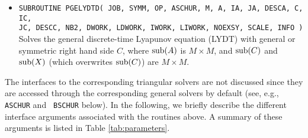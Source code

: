 \documentclass[11pt]{article}
\begin{document}
\begin{itemize}
\item \texttt{SUBROUTINE PGELYDTD( JOB, SYMM, OP, ASCHUR, M, A,
IA, JA, DESCA, C, IC, \\ JC, DESCC, NB2, DWORK, LDWORK, IWORK,
LIWORK, NOEXSY, SCALE, INFO ) } \\
Solves the general discrete-time Lyapunov equation (LYDT) with
general or symmetric right hand side $C$, where ${\rm sub}(A)$ is
$M \times M$, and ${\rm sub}(C)$ and ${\rm sub}(X)$ (which
overwrites ${\rm sub}(C)$) are $M \times M$. \\
\end{itemize}

The interfaces to the corresponding triangular solvers are not
discussed since they are accessed through the corresponding
general solvers by default (see, e.g., {\tt ASCHUR} and {\tt
BSCHUR} below). In the following, we briefly describe the
different interface arguments associated with the routines above.
A summary of these arguments is listed in Table
\ref{tab:parameters}.
\end{document}
